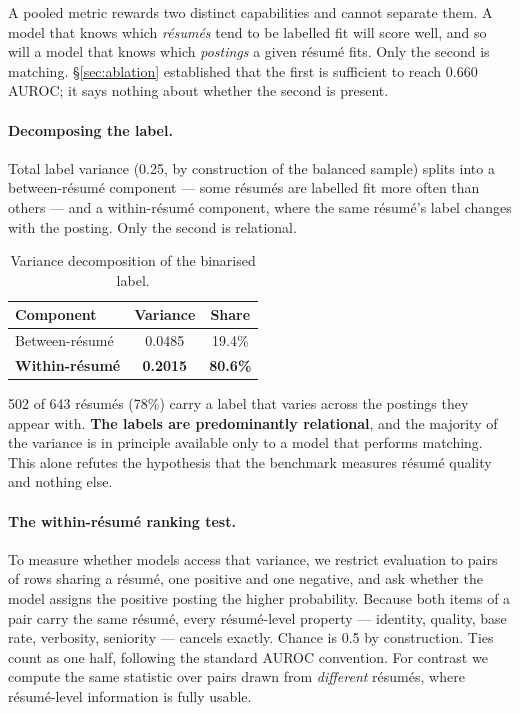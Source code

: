 \documentclass[11pt]{article}                      %
\newcommand{\tabfont}{\footnotesize}
\begin{document}
A pooled metric rewards two distinct capabilities and cannot separate them. A
model that knows which \emph{résumés} tend to be labelled fit will score well, and
so will a model that knows which \emph{postings} a given résumé fits. Only the
second is matching. \S\ref{sec:ablation} established that the first is sufficient
to reach 0.660 AUROC; it says nothing about whether the second is present.

\paragraph{Decomposing the label.}
Total label variance (0.25, by construction of the balanced sample) splits into a
between-résumé component --- some résumés are labelled fit more often than others
--- and a within-résumé component, where the same résumé's label changes with the
posting. Only the second is relational.

\begin{table}[h]
\centering\tabfont
\caption{Variance decomposition of the binarised label.}
\label{tab:variance}
\begin{tabular}{lcc}
\toprule
Component & Variance & Share \\
\midrule
Between-résumé & 0.0485 & 19.4\% \\
\textbf{Within-résumé} & \textbf{0.2015} & \textbf{80.6\%} \\
\bottomrule
\end{tabular}
\end{table}

502 of 643 résumés (78\%) carry a label that varies across the postings they
appear with. \textbf{The labels are predominantly relational}, and the majority of
the variance is in principle available only to a model that performs matching.
This alone refutes the hypothesis that the benchmark measures résumé quality and
nothing else.

\paragraph{The within-résumé ranking test.}
To measure whether models access that variance, we restrict evaluation to pairs
of rows sharing a résumé, one positive and one negative, and ask whether the
model assigns the positive posting the higher probability. Because both items of
a pair carry the same résumé, every résumé-level property --- identity, quality,
base rate, verbosity, seniority --- cancels exactly. Chance is 0.5 by
construction. Ties count as one half, following the standard AUROC convention.
For contrast we compute the same statistic over pairs drawn from \emph{different}
résumés, where résumé-level information is fully usable.
\end{document}
